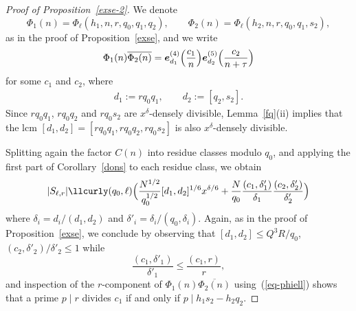 \documentclass[12pt,a4paper,reqno]{amsart}
\numberwithin{equation}{section}
\theoremstyle{plain}
\theoremstyle{definition}
\newcommand\Z{\mathbb{Z}}
\newcommand{\uple}[1]{\text{\boldmath${#1}$}}
\renewcommand{\lessapprox}{\llcurly}
\newcommand{\onef}{\mathbf{1}}
\begin{document}
\begin{proof}[Proof of Proposition~\ref{exse-2}]
  We denote 
$$
\Phi_1(n)=\Phi_{\ell}(h_1,n,r,q_0,q_1,q_2),\quad\quad
\Phi_2(n)=\Phi_{\ell}(h_2,n,r,q_0,q_1,s_2),
$$
as in the proof of Proposition~\ref{exse}, and we write
$$
\Phi_1(n)\overline{\Phi_2(n)}= \uple{e}^{(4)}_{d_1} \Bigl( \frac{c_1}{n}
\Bigr) \uple{e}^{(5)}_{d_2}\Bigl( \frac{c_2}{n+\tau} \Bigr)
$$
for some $c_1$ and $c_2$, where
\begin{gather*}
  d_1 := r q_0 q_1,\quad\quad d_2 := [q_2,s_2].
\end{gather*}
Since $rq_0q_1$, $rq_0q_2$ and $rq_0s_2$ are $x^{\delta}$-densely
divisible, Lemma~\ref{fq}(ii) implies that the lcm
$[d_1,d_2]=[rq_0q_1,rq_0q_2,rq_0s_2]$ is also $x^{\delta}$-densely
divisible.
\par
Splitting again the factor $C(n)$ into residue classes modulo $q_0$,
and applying the first part of Corollary~\ref{dons} to each residue class,
we obtain
$$
|S_{\ell,r}|\lessapprox (q_0,\ell) \Bigl(
\frac{N^{1/2}}{q_0^{1/2}} [d_1,d_2]^{1/6} x^{\delta/6} +
\frac{N}{q_0}\frac{(c_1,\delta'_1)}{\delta_1}
\frac{(c_2,\delta'_2)}{\delta'_2} \Bigr)
$$
where $\delta_i=d_i/(d_1,d_2)$ and $\delta'_i = \delta_i/(q_0,\delta_i)$. Again, as in the proof of
Proposition~\ref{exse}, we conclude by observing that $[d_1,d_2]\leq
Q^3R/q_0$, $(c_2,\delta'_2)/\delta'_2\leq 1$ while
$$ 
\frac{(c_1,\delta'_1)}{\delta'_1}\leq\frac{(c_1,r)}{r},
$$
and inspection of the $r$-component of $\Phi_1(n)\overline{\Phi_2(n)}$
using~(\ref{eq-phiell}) shows that a prime $p\mid r$ divides $c_1$ if
and only if $p\mid h_1s_2-h_2q_2$.

\end{proof}
\end{document}
